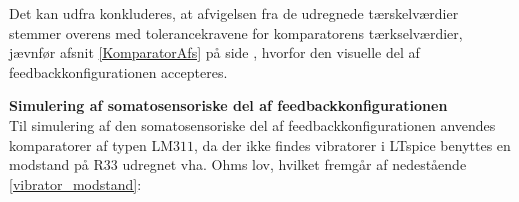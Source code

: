 
\noindent Det kan udfra  konkluderes, at afvigelsen fra de udregnede tærskelværdier stemmer overens med tolerancekravene for komparatorens tærkselværdier, jævnfør afsnit \ref{KomparatorAfs} på side \pageref{KomparatorAfs}, hvorfor den visuelle del af feedbackkonfigurationen accepteres. 

\noindent\textbf{Simulering af somatosensoriske del af feedbackkonfigurationen} \\
Til simulering af den somatosensoriske del af feedbackkonfigurationen anvendes komparatorer af typen LM$311$, da der ikke findes vibratorer i LTspice benyttes en modstand på R$33$ udregnet vha. Ohms lov, hvilket fremgår af nedestående \eqref{vibrator_modstand}:

